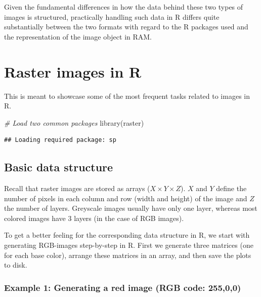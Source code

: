 \documentclass[
  12pt,
]{style/krantz}
\newenvironment{Shaded}{\begin{snugshade}}{\end{snugshade}}
\newcommand{\CommentTok}[1]{\textcolor[rgb]{0.56,0.35,0.01}{\textit{#1}}}
\newcommand{\FunctionTok}[1]{\textcolor[rgb]{0.00,0.00,0.00}{#1}}
\newcommand{\NormalTok}[1]{#1}
\begin{document}
Given the fundamental differences in how the data behind these two types of images is structured, practically handling such data in R differs quite substantially between the two formats with regard to the R packages used and the representation of the image object in RAM.

\hypertarget{raster-images-in-r}{%
\section{Raster images in R}\label{raster-images-in-r}}

This is meant to showcase some of the most frequent tasks related to images in R.

\begin{Shaded}
\begin{Highlighting}[]
\CommentTok{\# Load two common packages}
\FunctionTok{library}\NormalTok{(raster) }
\end{Highlighting}
\end{Shaded}

\begin{verbatim}
## Loading required package: sp
\end{verbatim}

\hypertarget{basic-data-structure}{%
\subsection{Basic data structure}\label{basic-data-structure}}

Recall that raster images are stored as arrays (\(X\times Y \times Z\)). \(X\) and \(Y\) define the number of pixels in each column and row (width and height) of the image and \(Z\) the number of layers. Greyscale images usually have only one layer, whereas most colored images have 3 layers (in the case of RGB images).

To get a better feeling for the corresponding data structure in R, we start with generating RGB-images step-by-step in R. First we generate three matrices (one for each base color), arrange these matrices in an array, and then save the plots to disk.

\hypertarget{example-1-generating-a-red-image-rgb-code-25500}{%
\subsubsection{Example 1: Generating a red image (RGB code: 255,0,0)}\label{example-1-generating-a-red-image-rgb-code-25500}}
\end{document}
